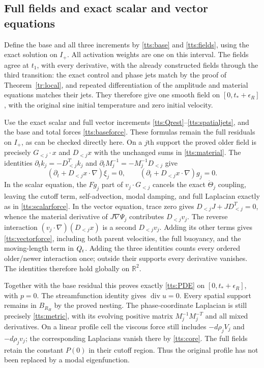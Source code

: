 \subsection{Full fields and exact scalar and vector equations}

Define the base and all three increments by
\eqref{tts:base} and \eqref{tts:fields}, using the exact
solution on $I_+$. All activation weights are one on this interval.
The fields agree at $t_1$, with every derivative, with the already
constructed fields through the third transition: the exact control
and phase jets match by the proof of Theorem~\ref{tr:local},
and repeated differentiation of the amplitude and material equations
matches their jets. They therefore give one smooth field on
$[0,t_*+\epsilon_R]$, with the original sine initial temperature
and zero initial velocity.

Use the exact scalar and full vector increments
\eqref{tts:Qrest}--\eqref{tts:spatialjets}, and the base
and total forces \eqref{tts:baseforce}. These formulas remain
the full residuals on $I_+$, as can be checked directly here.
On a $j$th support the proved older field is precisely
$G_{<j}\cdot x$ and $D_{<j}x$ with the unchanged sums in
\eqref{tts:material}. The identities
$\partial_t k_j=-D_{<j}^Tk_j$ and
$\partial_t M_j^{-1}=-M_j^{-1}D_{<j}$ give
\[
 (\partial_t+D_{<j}x\cdot\nabla)\xi_j=0,
 \qquad
 (\partial_t+D_{<j}x\cdot\nabla)g_j=0.
\]
In the scalar equation, the $F g_j$ part of
$v_j\cdot G_{<j}$ cancels the exact $\dot\Theta_j$
coupling, leaving the cutoff term, self-advection, modal damping,
and full Laplacian exactly as in \eqref{tts:scalarforce}.
In the vector equation, trace zero gives
$D_{<j}J+JD_{<j}^T=0$, whence the material derivative of
$J\nabla\Psi_j$ contributes $D_{<j}v_j$.
The reverse interaction $(v_j\cdot\nabla)(D_{<j}x)$
is a second $D_{<j}v_j$. Adding its other terms gives
\eqref{tts:vectorforce}, including both parent velocities,
the full buoyancy, and the moving-length term in $Q_{\rm r}$.
Adding the three identities counts every ordered older/newer
interaction once; outside their supports every derivative vanishes.
The identities therefore hold globally on $\mathbb R^2$.

Together with the base residual this proves exactly
\eqref{tts:PDE} on $[0,t_*+\epsilon_R]$, with $p=0$.
The streamfunction identity gives $\operatorname{div}u=0$.
Every spatial support remains in $B_{R_H}$ by the proved nesting.
The phase-coordinate Laplacian is still precisely
\eqref{tts:metric}, with its evolving positive matrix
$M_j^{-1}M_j^{-T}$ and all mixed derivatives. On a linear
profile cell the viscous force still includes
$-d\rho_jV_j$ and $-d\rho_jv_j$; the corresponding
Laplacians vanish there by \eqref{tts:core}. The full fields
retain the constant $P(0)$ in their cutoff region. Thus the
original profile has not been replaced by a modal eigenfunction.


